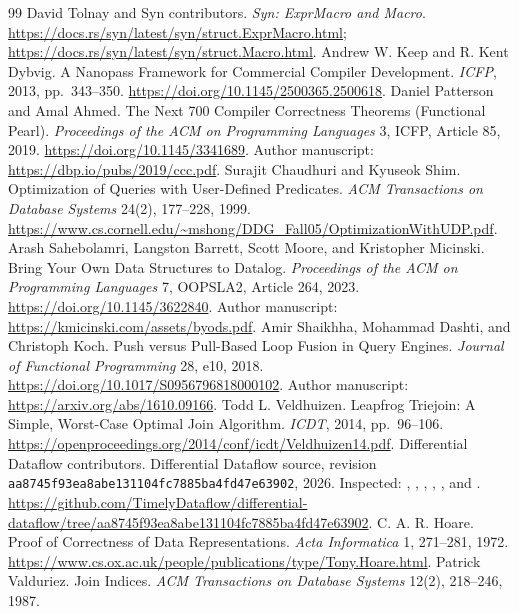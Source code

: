 \begin{thebibliography}{99}
David Tolnay and Syn contributors. \emph{Syn: ExprMacro and Macro}.
\url{https://docs.rs/syn/latest/syn/struct.ExprMacro.html};
\url{https://docs.rs/syn/latest/syn/struct.Macro.html}.
 Andrew W. Keep and R. Kent Dybvig.
A Nanopass Framework for Commercial Compiler Development.
\emph{ICFP}, 2013, pp.~343--350.
\url{https://doi.org/10.1145/2500365.2500618}.
 Daniel Patterson and Amal Ahmed.
The Next 700 Compiler Correctness Theorems (Functional Pearl).
\emph{Proceedings of the ACM on Programming Languages} 3, ICFP,
Article 85, 2019.
\url{https://doi.org/10.1145/3341689}.
Author manuscript: \url{https://dbp.io/pubs/2019/ccc.pdf}.
 Surajit Chaudhuri and Kyuseok Shim.
Optimization of Queries with User-Defined Predicates.
\emph{ACM Transactions on Database Systems} 24(2), 177--228, 1999.
\url{https://www.cs.cornell.edu/~mshong/DDG_Fall05/OptimizationWithUDP.pdf}.
 Arash Sahebolamri, Langston Barrett, Scott Moore,
and Kristopher Micinski. Bring Your Own Data Structures to Datalog.
\emph{Proceedings of the ACM on Programming Languages} 7, OOPSLA2,
Article 264, 2023.
\url{https://doi.org/10.1145/3622840}.
Author manuscript: \url{https://kmicinski.com/assets/byods.pdf}.
 Amir Shaikhha, Mohammad Dashti, and Christoph Koch.
Push versus Pull-Based Loop Fusion in Query Engines.
\emph{Journal of Functional Programming} 28, e10, 2018.
\url{https://doi.org/10.1017/S0956796818000102}.
Author manuscript: \url{https://arxiv.org/abs/1610.09166}.
 Todd L. Veldhuizen.
Leapfrog Triejoin: A Simple, Worst-Case Optimal Join Algorithm.
\emph{ICDT}, 2014, pp.~96--106.
\url{https://openproceedings.org/2014/conf/icdt/Veldhuizen14.pdf}.
 Differential Dataflow contributors.
Differential Dataflow source, revision
\texttt{aa8745f93ea8abe131104fc7885ba4fd47e63902}, 2026.
Inspected: , ,
, ,
, and .
\url{https://github.com/TimelyDataflow/differential-dataflow/tree/aa8745f93ea8abe131104fc7885ba4fd47e63902}.
 C. A. R. Hoare.
Proof of Correctness of Data Representations.
\emph{Acta Informatica} 1, 271--281, 1972.
\url{https://www.cs.ox.ac.uk/people/publications/type/Tony.Hoare.html}.
 Patrick Valduriez.
Join Indices.
\emph{ACM Transactions on Database Systems} 12(2), 218--246, 1987.

\end{thebibliography}
